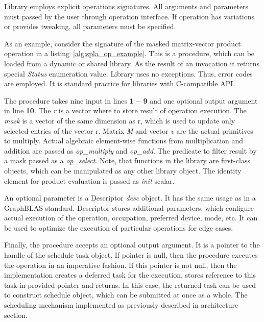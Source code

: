 Library employs explicit operations signatures. All arguments and parameters must passed by the user through operation interface. If operation has variations or provides tweaking, all parameters must be specified.

As an example, consider the signature of the masked matrix-vector product operation in a listing~\ref{alg:spla_op_example}. This is a procedure, which can be loaded from a dynamic or shared library. As the result of an invocation it returns special \textit{Status} enumeration value. Library uses no exceptions. Thus, error codes are employed. It is standard practice for libraries with C-compatible API. 

The procedure takes nine input in lines \textbf{1 -- 9} and one optional output argument in line \textbf{10}. The \textit{r} is a vector where to store result of operation execution. The \textit{mask} is a vector of the same dimension as r, which is used to update only selected entries of the vector r. Matrix \textit{M} and vector \textit{v} are the actual primitives to multiply. Actual algebraic element-wise functions from multiplication and addition are passed as \textit{op\_multiply} and \textit{op\_add}. The predicate to filter result by a mask passed as a \textit{op\_select}. Note, that functions in the library are first-class objects, which can be manipulated as any other library object. The identity element for product evaluation is passed as \textit{init} scalar.

An optional parameter is a Descriptor \textit{desc} object. It has the same usage as in a GraphBLAS standard. Descriptor stores additional parameters, which configure actual execution of the operation, occupation, preferred device, mode, etc. It can be used to optimize the execution of particular operations for edge cases.

Finally, the procedure accepts an optional output argument. It is a pointer to the handle of the schedule task object. If pointer is null, then the procedure executes the operation in an imperative fashion. If this pointer is not null, then the implementation creates a deferred task for the execution, stores reference to this task in provided pointer and returns. In this case, the returned task can be used to construct schedule object, which can be submitted at once as a whole. The scheduling mechanism implemented as previously described in architecture section.

\lstset{style=codelistingstyle}

